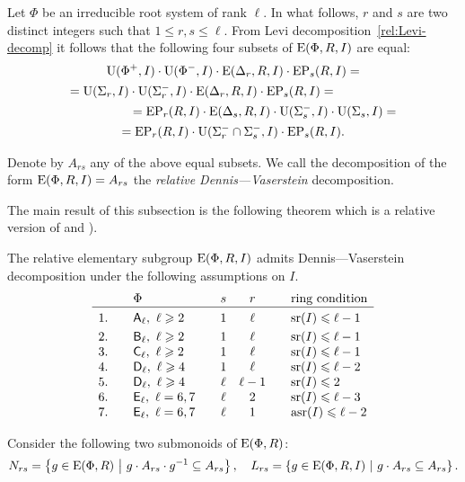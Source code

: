 Let $\Phi$ be an irreducible root system of rank $\ell$.
In what follows, $r$ and $s$ are two distinct integers such that $1 \leq r, s \leq \ell$.
From Levi decomposition~\ref{rel:Levi-decomp} it follows that the following four subsets of $\operatorname{E}(\Phi, R, I)$ are equal:
\begin{multline*}
\operatorname{U}(\Phi^+, I)\cdot \operatorname{U}(\Phi^-, I) \cdot \operatorname{E}(\Delta_r, R, I) \cdot \operatorname{EP}_s(R, I) = \\
= \operatorname{U}(\Sigma_r, I)\cdot \operatorname{U}(\Sigma^-_r, I) \cdot \operatorname{E}(\Delta_r, R, I) \cdot \operatorname{EP}_s(R, I) = \hspace{5em} \\
\hspace{5em} = \operatorname{EP}_r(R, I) \cdot \operatorname{E}(\Delta_s, R, I) \cdot \operatorname{U}(\Sigma_s^-, I)\cdot \operatorname{U}(\Sigma_s, I) = \\
= \operatorname{EP}_r(R, I) \cdot \operatorname{U}(\Sigma^-_r \cap \Sigma^-_s, I) \cdot \operatorname{EP}_s(R, I).
\end{multline*}

\begin{dfn}
 Denote by $A_{rs}$ any of the above equal subsets.
 We call the decomposition of the form $\operatorname{E}(\Phi, R, I) = A_{rs}$ the {\it relative Dennis---Vaserstein} decomposition.
\end{dfn}

The main result of this subsection is the following theorem which is a relative version of \cite[Lemma~2.1]{ST76} and \cite[Theorem~2.5]{St78}).
\begin{thm}\label{thm:DennisVaserstein}
The relative elementary subgroup $\operatorname{E}(\Phi, R, I)$ admits Dennis---Vaserstein decomposition under the following assumptions on $I$.
\[\begin{array}{l@{\qquad}l@{\qquad}c@{\quad}c@{\qquad}l}
   & \Phi                                 & s    & r      & \text{ring condition} \\ \hline\vphantom{\Bigl(}
1. & \rA_\ell,\ \ell\geqslant 2            & 1    & \ell   & \sr(I) \leqslant \ell-1 \\    
2. & \rB_\ell,\ \ell\geqslant 2            & 1    & \ell   & \sr(I) \leqslant \ell-1 \\
3. & \rC_\ell,\ \ell \geqslant 2          & 1    & \ell   & \sr(I) \leqslant \ell-1 \\
4. & \rD_\ell,\ \ell\geqslant 4           & 1    & \ell   & \sr(I) \leqslant \ell-2 \\ 
5. & \rD_\ell,\ \ell\geqslant 4           & \ell & \ell-1 & \sr(I) \leqslant 2      \\
6. & \rE_\ell,\ \ell=6,7                  & \ell & 2      & \sr(I) \leqslant \ell-3 \\ 
7. & \rE_\ell,\ \ell=6,7                  & \ell & 1      & \asr(I)\leqslant \ell-2 \end{array}\]
\end{thm}
Consider the following two submonoids of $\operatorname{E}(\Phi, R)$:
\[ N_{rs} = \left\{ g\in \operatorname{E}(\Phi, R)\ \middle|\ g \cdot A_{rs} \cdot g^{-1} \subseteq A_{rs} \right\}, \quad
   L_{rs}=  \left\{ g\in \operatorname{E}(\Phi, R, I)\ \middle|\ g \cdot A_{rs} \subseteq A_{rs} \right\}. \]

